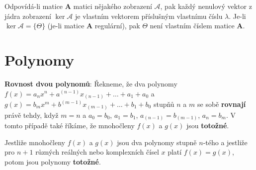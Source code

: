 {      \begin{note}
        Odpovídá-li matice \(\mathbf{A}\) matici nějakého zobrazení \(\mathcal{A}\), pak každý 
        nenulový vektor z jádra zobrazení \(\ker\mathcal{A}\) je vlastním vektorem příslušným 
        vlastnímu číslu \(\lambda\). Je-li \(\ker\mathcal{A} = \{\Theta\}\) 
        (je-li matice \(\mathbf{A}\) regulární), pak \(\Theta\) není vlastním číslem matice 
        \(\mathbf{A}\).
      \end{note}

        

        

        


       

  \section{Polynomy}
      \begin{definition}\label{def_rov_poly}\textbf{Rovnost dvou polynomů}:
        Řekneme, že dva polynomy \(f(x)=a_nx^n+a^{(n-1)}x_{(n-1)}+\ldots+a_1+a_0\) a
        \(g(x)=b_mx^m+b^{(m-1)}x_{(m-1)}+\ldots+b_1+b_0\) stupňů \(n\) a \(m\) se sobě 
        \textbf{rovnají} právě tehdy, když \(m=n\) a \(a_0=b_0\), \(a_1=b_1\), 
        \(a_{(n-1)}=b_{(m-1)}\), \(a_n=b_m\). V tomto případě také říkáme, že mnohočleny \(f(x)\) a 
        \(g(x)\) jsou \textbf{totožné}.
      \end{definition}
      \begin{lemma}\label{la:eq_eqv_poly}
        Jestliže mnohočleny \(f(x)\) a \(g(x)\) jsou dva polynomy stupně \(n\)-tého a jestliže pro 
        \(n+1\) různých reálných nebo komplexních čísel \(x\) platí \(f(x)=g(x)\), potom jsou 
        polynomy \textbf{totožné}.
      \end{lemma}
      
}

